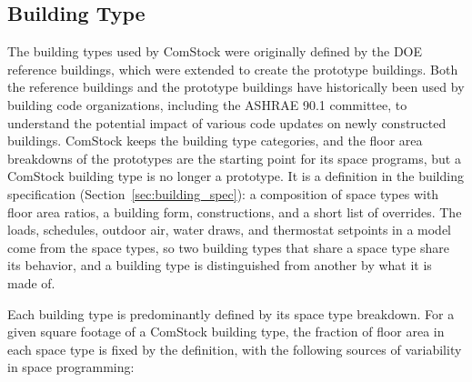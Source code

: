 

\subsection{Building Type}
\label{sec:building_type_meta}

The building types used by ComStock were originally defined by the DOE reference buildings, which were extended to create the prototype buildings. Both the reference buildings and the prototype buildings have historically been used by building code organizations, including the ASHRAE 90.1 committee, to understand the potential impact of various code updates on newly constructed buildings. ComStock keeps the building type categories, and the floor area breakdowns of the prototypes are the starting point for its space programs, but a ComStock building type is no longer a prototype. It is a definition in the building specification (Section~\ref{sec:building_spec}): a composition of space types with floor area ratios, a building form, constructions, and a short list of overrides. The loads, schedules, outdoor air, water draws, and thermostat setpoints in a model come from the space types, so two building types that share a space type share its behavior, and a building type is distinguished from another by what it is made of.

Each building type is predominantly defined by its space type breakdown. For a given square footage of a ComStock building type, the fraction of floor area in each space type is fixed by the definition, with the following sources of variability in space programming:

